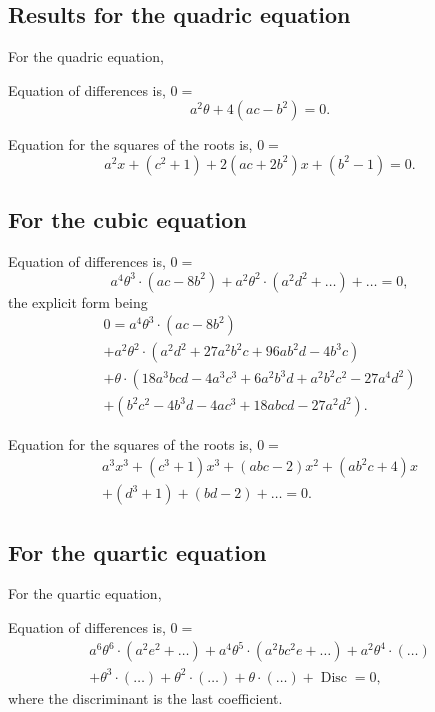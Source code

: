 \documentclass[11pt,a4paper]{book}
\providecommand{\Disc}{\mathop{\mathrm{Disc}}\nolimits}
\begin{document}
\subsection*{Results for the quadric equation}

For the quadric equation,

Equation of differences is, $0=$
\[
a^2\theta+4(ac-b^2)=0.
\]

Equation for the squares of the roots is, $0=$
\[
a^2x+(c^2+1)+2(ac+2b^2)x+(b^2-1)=0.
\]

\subsection*{For the cubic equation}

Equation of differences is, $0=$
\[
a^4\theta^3\cdot(ac-8b^2)+a^2\theta^2\cdot(a^2d^2+\ldots)+\ldots=0,
\]
the explicit form being
\begin{multline*}
0=a^4\theta^3\cdot(ac-8b^2)\\
+a^2\theta^2\cdot(a^2d^2+27a^2b^2c+96ab^2d-4b^3c)\\
+\theta\cdot(18a^3bcd-4a^3c^3+6a^2b^3d+a^2b^2c^2-27a^4d^2)\\
+(b^2c^2-4b^3d-4ac^3+18abcd-27a^2d^2).
\end{multline*}

Equation for the squares of the roots is, $0=$
\begin{multline*}
a^3x^3+(c^3+1)x^3+(abc-2)x^2+(ab^2c+4)x\\
+(d^3+1)+(bd-2)+\ldots=0.
\end{multline*}

\subsection*{For the quartic equation}

For the quartic equation,

Equation of differences is, $0=$
\begin{multline*}
a^6\theta^6\cdot(a^2e^2+\ldots)+a^4\theta^5\cdot(a^2bc^2e+\ldots)+a^2\theta^4\cdot(\ldots)\\
+\theta^3\cdot(\ldots)+\theta^2\cdot(\ldots)+\theta\cdot(\ldots)+\Disc=0,
\end{multline*}
where the discriminant is the last coefficient.
\end{document}
